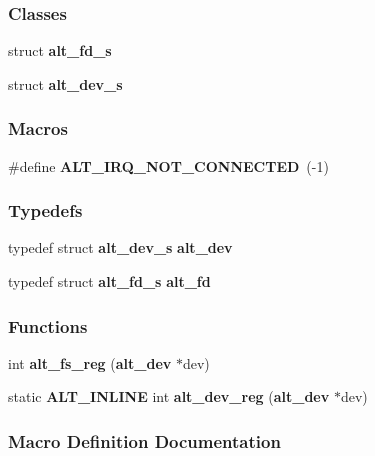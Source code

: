 \subsubsection*{Classes}
\begin{DoxyCompactItemize}
\item 
struct {\bf alt\+\_\+fd\+\_\+s}
\item 
struct {\bf alt\+\_\+dev\+\_\+s}
\end{DoxyCompactItemize}
\subsubsection*{Macros}
\begin{DoxyCompactItemize}
\item 
\#define {\bf A\+L\+T\+\_\+\+I\+R\+Q\+\_\+\+N\+O\+T\+\_\+\+C\+O\+N\+N\+E\+C\+T\+ED}~(-\/1)
\end{DoxyCompactItemize}
\subsubsection*{Typedefs}
\begin{DoxyCompactItemize}
\item 
typedef struct {\bf alt\+\_\+dev\+\_\+s} {\bf alt\+\_\+dev}
\item 
typedef struct {\bf alt\+\_\+fd\+\_\+s} {\bf alt\+\_\+fd}
\end{DoxyCompactItemize}
\subsubsection*{Functions}
\begin{DoxyCompactItemize}
\item 
int {\bf alt\+\_\+fs\+\_\+reg} ({\bf alt\+\_\+dev} $\ast$dev)
\item 
static {\bf A\+L\+T\+\_\+\+I\+N\+L\+I\+NE} int {\bf alt\+\_\+dev\+\_\+reg} ({\bf alt\+\_\+dev} $\ast$dev)
\end{DoxyCompactItemize}


\subsubsection{Macro Definition Documentation}
